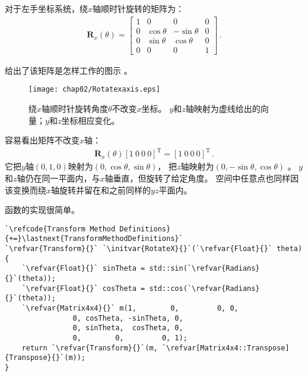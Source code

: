 对于左手坐标系统，绕$x$轴顺时针旋转的矩阵为：
\begin{align*}
    \bm R_x(\theta)=\left[
        \begin{array}{cccc}
            1 & 0          & 0           & 0 \\
            0 & \cos\theta & -\sin\theta & 0 \\
            0 & \sin\theta & \cos\theta  & 0 \\
            0 & 0          & 0           & 1
        \end{array}
        \right]\, .
\end{align*}

给出了该矩阵是怎样工作的图示
。
\begin{figure}[htbp]
    \centering\texttt{[image: chap02/Rotatexaxis.eps]}
    \caption{绕$x$轴顺时针旋转角度$\theta$不改变$x$坐标。
        $y$和$z$轴映射为虚线给出的向量；$y$和$z$坐标相应变化。}
    \label{fig:2.11}
\end{figure}

容易看出矩阵不改变$x$轴：
\begin{align*}
    \bm R_x(\theta)[1\ 0\ 0\ 0]^\mathrm{T}=[1\ 0\ 0\ 0]^\mathrm{T}\, .
\end{align*}
它把$y$轴$(0,1,0)$映射为$(0,\cos\theta,\sin\theta)$，
把$z$轴映射为$(0,-\sin\theta,\cos\theta)$
。
$y$和$z$轴仍在同一平面内，与$x$轴垂直，但旋转了给定角度。
空间中任意点也同样因该变换而绕$x$轴旋转并留在和之前同样的$yz$平面内。

函数的实现很简单。
\begin{lstlisting}
`\refcode{Transform Method Definitions}{+=}\lastnext{TransformMethodDefinitions}`
`\refvar{Transform}{}` `\initvar{RotateX}{}`(`\refvar{Float}{}` theta) {
    `\refvar{Float}{}` sinTheta = std::sin(`\refvar{Radians}{}`(theta));
    `\refvar{Float}{}` cosTheta = std::cos(`\refvar{Radians}{}`(theta));
    `\refvar{Matrix4x4}{}` m(1,        0,         0, 0, 
                0, cosTheta, -sinTheta, 0,
                0, sinTheta,  cosTheta, 0,
                0,        0,         0, 1);
    return `\refvar{Transform}{}`(m, `\refvar[Matrix4x4::Transpose]{Transpose}{}`(m));
}
\end{lstlisting}

